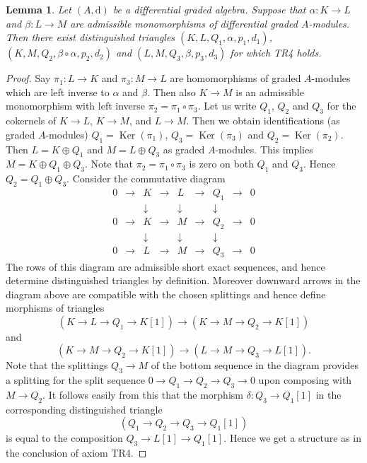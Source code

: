 \documentclass{stacks-project}
\theoremstyle{plain}
\newtheorem{lemma}[subsection]{Lemma}
\theoremstyle{definition}
\theoremstyle{remark}
\numberwithin{equation}{subsection}
\def\Ker{\mathop{\mathrm{Ker}}}
\begin{document}
\begin{lemma}
\label{lemma-two-split-injections}
Let $(A, \text{d})$ be a differential graded algebra. Suppose that
$\alpha : K \to L$ and $\beta : L \to M$ are admissible monomorphisms
of differential graded $A$-modules. Then there exist distinguished triangles
$(K, L, Q_1, \alpha, p_1, d_1)$, $(K, M, Q_2, \beta \circ \alpha, p_2, d_2)$
and $(L, M, Q_3, \beta, p_3, d_3)$ for which TR4 holds.
\end{lemma}

\begin{proof}
Say $\pi_1 : L \to K$ and $\pi_3 : M \to L$ are homomorphisms
of graded $A$-modules which are left inverse to $\alpha$ and $\beta$.
Then also $K \to M$ is an admissible monomorphism with left
inverse $\pi_2 = \pi_1 \circ \pi_3$. Let us write $Q_1$, $Q_2$
and $Q_3$ for the cokernels of $K \to L$, $K \to M$, and $L \to M$.
Then we obtain identifications (as graded $A$-modules)
$Q_1 = \Ker(\pi_1)$, $Q_3 = \Ker(\pi_3)$ and
$Q_2 = \Ker(\pi_2)$. Then $L = K \oplus Q_1$ and
$M = L \oplus Q_3$ as graded $A$-modules. This implies
$M = K \oplus Q_1 \oplus Q_3$. Note that $\pi_2 = \pi_1 \circ \pi_3$
is zero on both $Q_1$ and $Q_3$. Hence $Q_2 = Q_1 \oplus Q_3$.
Consider the commutative diagram
$$
\begin{matrix}
0 & \to & K & \to & L & \to & Q_1 & \to & 0 \\
  &     & \downarrow &     & \downarrow &     & \downarrow  & \\
0 & \to & K & \to & M & \to & Q_2 & \to & 0 \\
  &     & \downarrow &     & \downarrow &     & \downarrow  & \\
0 & \to & L & \to & M & \to & Q_3 & \to & 0
\end{matrix}
$$
The rows of this diagram are admissible short exact sequences, and
hence determine distinguished triangles by definition. Moreover
downward arrows in the diagram above are compatible with the chosen
splittings and hence define morphisms of triangles
$$
(K \to L \to Q_1 \to K[1])
\longrightarrow
(K \to M \to Q_2 \to K[1])
$$
and
$$
(K \to M \to Q_2 \to K[1])
\longrightarrow
(L \to M \to Q_3 \to L[1]).
$$
Note that the splittings $Q_3 \to M$ of the bottom sequence in the
diagram provides a splitting for the split sequence
$0 \to Q_1 \to Q_2 \to Q_3 \to 0$ upon composing with $M \to Q_2$.
It follows easily from this that the morphism $\delta : Q_3 \to Q_1[1]$
in the corresponding distinguished triangle
$$
(Q_1 \to Q_2 \to Q_3 \to Q_1[1])
$$
is equal to the composition $Q_3 \to L[1] \to Q_1[1]$.
Hence we get a structure as in the conclusion of axiom TR4.
\end{proof}
\end{document}
